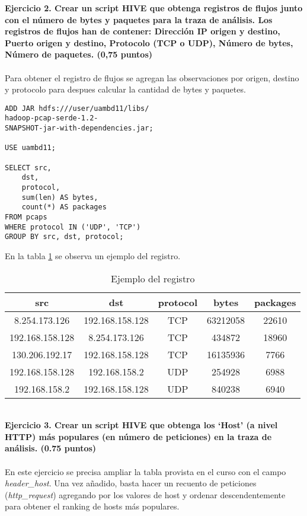 \textbf{Ejercicio 2. Crear un script HIVE que obtenga registros de flujos junto con el número de bytes y paquetes
	para la traza de análisis. Los registros de flujos han de contener: Dirección IP origen y destino, Puerto origen y destino, Protocolo (TCP o UDP), Número de bytes, Número de paquetes. (0,75 puntos)}\\\\
Para obtener el registro de flujos se agregan las observaciones por origen, destino y protocolo para despues calcular la cantidad de bytes y paquetes. 
\begin{lstlisting}[caption=Consulta para obtener el registro de flujos]
ADD JAR hdfs:///user/uambd11/libs/
hadoop-pcap-serde-1.2-
SNAPSHOT-jar-with-dependencies.jar;

USE uambd11;

SELECT src,
	dst, 
	protocol,
	sum(len) AS bytes,
	count(*) AS packages 
FROM pcaps
WHERE protocol IN ('UDP', 'TCP')
GROUP BY src, dst, protocol;
\end{lstlisting}
En la tabla \ref{tab:c2} se observa un ejemplo del registro.
\begin{table}[ht]
	\centering
	\caption{Ejemplo del registro}
	\begin{tabular}[t]{ccccc}
		src	& dst &	protocol &	bytes &	packages\\
		\hline
		8.254.173.126 & 192.168.158.128	& TCP &	63212058 &	22610 \\
			192.168.158.128 &	8.254.173.126 &	TCP &	434872 &	18960\\
			130.206.192.17 &	192.168.158.128 &	TCP  &	16135936 &	7766 \\
			192.168.158.128 &	192.168.158.2 &	UDP &	254928 &	6988\\
			192.168.158.2 &	192.168.158.128 &	UDP &	840238 &	6940
	\end{tabular}
	\label{tab:c2}
\end{table}%
\\
\textbf{Ejercicio 3. Crear un script HIVE que obtenga los ‘Host’ (a nivel HTTP) más populares (en número de
	peticiones) en la traza de análisis. (0.75 puntos)}\\\\
En este ejercicio se precisa ampliar la tabla provista en el curso con el campo \textit{header\_host}. Una vez añadido, basta hacer un recuento de peticiones (\textit{http\_request}) agregando por los valores de host y ordenar descendentemente para obtener el ranking de hosts más populares.
